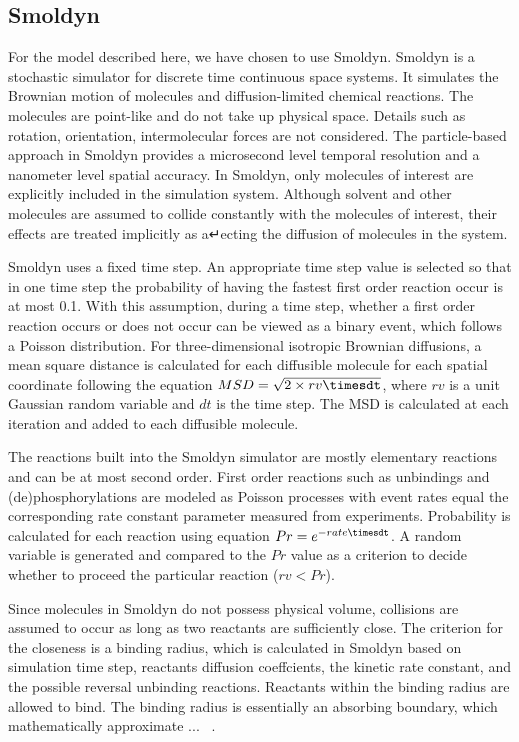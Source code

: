 \subsection{Smoldyn}

For the model described here, we have chosen to use Smoldyn. Smoldyn is a stochastic simulator for discrete time continuous space systems. It simulates the Brownian motion of molecules and diffusion-limited chemical reactions. The molecules are point-like and do not take up physical space. Details such as rotation, orientation, intermolecular forces are not considered. The particle-based approach in Smoldyn provides a microsecond level temporal resolution and a nanometer level spatial accuracy. In Smoldyn, only molecules of interest are explicitly included in the simulation system. Although solvent and other molecules are assumed to collide constantly with the molecules of interest, their effects are treated implicitly as a↵ecting the diffusion of molecules in the system.

Smoldyn uses a fixed time step. An appropriate time step value is selected so that in one time step the probability of having the fastest first order reaction occur is at most 0.1. With this assumption, during a time step, whether a first order reaction occurs or does not occur can be viewed as a binary event, which follows a Poisson distribution. For three-dimensional isotropic Brownian diffusions, a mean square distance is calculated for each diffusible molecule for each spatial coordinate following the equation $MSD = \sqrt{2\times rv\timesdt}$, where $rv$ is a unit Gaussian random variable and $dt$ is the time step. The MSD is calculated at each iteration and added to each diffusible molecule.

The reactions built into the Smoldyn simulator are mostly elementary reactions and can be at most second order. First order reactions such as unbindings and (de)phosphorylations are modeled as Poisson processes with event rates equal the corresponding rate constant parameter measured from experiments. Probability is calculated for each reaction using equation $Pr=e^{-rate\timesdt}$. A random variable is generated and compared to the $Pr$ value as a criterion to decide whether to proceed the particular reaction ($rv<Pr$). 

Since molecules in Smoldyn do not possess physical volume, collisions are assumed to occur as long as two reactants are sufficiently close. The criterion for the closeness is a binding radius, which is calculated in Smoldyn based on simulation time step, reactants diffusion coeffcients, the kinetic rate constant, and the possible reversal unbinding reactions. Reactants within the binding radius are allowed to bind. The binding radius is essentially an absorbing boundary, which mathematically approximate 
... ~\cite{Andrews}.

